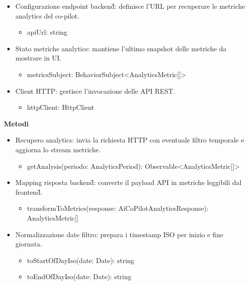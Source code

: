 \documentclass[a4paper,11pt]{article}
\begin{document}
\begin{itemize}[noitemsep, topsep=0pt]
\item Configurazione endpoint backend\G{}: definisce l'URL per recuperare le metriche analytics del co-pilot.
\begin{itemize}[noitemsep, topsep=0pt]
\item apiUrl: string
\end{itemize}
\item Stato metriche analytics: mantiene l'ultimo snapshot delle metriche da mostrare in UI.
\begin{itemize}[noitemsep, topsep=0pt]
\item metricsSubject: BehaviorSubject<AnalyticsMetric[]>
\end{itemize}
\item Client HTTP: gestisce l'invocazione delle API REST.
\begin{itemize}[noitemsep, topsep=0pt]
\item httpClient: HttpClient
\end{itemize}
\end{itemize}

\textbf{Metodi}
\begin{itemize}[noitemsep, topsep=0pt]
\item Recupero analytics: invia la richiesta HTTP con eventuale filtro temporale e aggiorna lo stream metriche.
\begin{itemize}[noitemsep, topsep=0pt]
\item getAnalysis(periodo: AnalyticsPeriod): Observable<AnalyticsMetric[]>
\end{itemize}

\item Mapping risposta backend\G{}: converte il payload API in metriche leggibili dal frontend\G{}.
\begin{itemize}[noitemsep, topsep=0pt]
\item transformToMetrics(response: AiCoPilotAnalyticsResponse): AnalyticsMetric[]
\end{itemize}

\item Normalizzazione date filtro: prepara i timestamp ISO per inizio e fine giornata.
\begin{itemize}[noitemsep, topsep=0pt]
\item toStartOfDayIso(date: Date): string
\item toEndOfDayIso(date: Date): string
\end{itemize}
\end{itemize}
\end{document}
